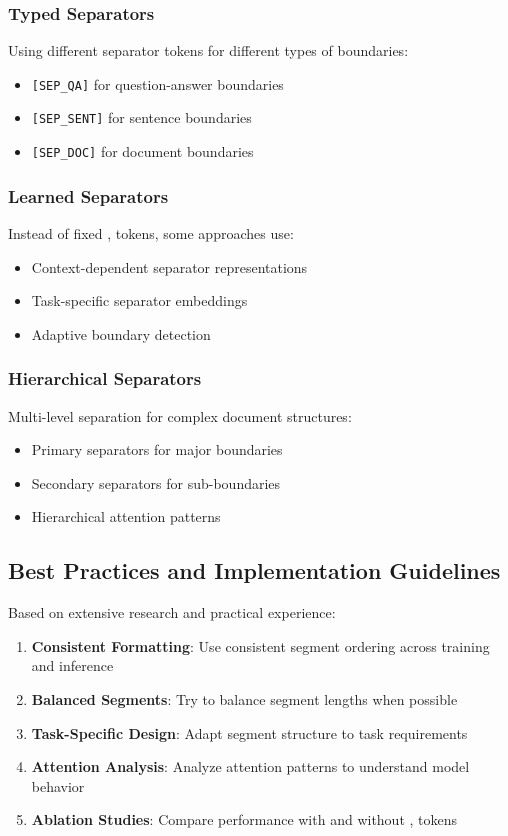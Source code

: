 \subsubsection{Typed Separators}
Using different separator tokens for different types of boundaries:
\begin{itemize}
\item \texttt{[SEP\_QA]} for question-answer boundaries
\item \texttt{[SEP\_SENT]} for sentence boundaries
\item \texttt{[SEP\_DOC]} for document boundaries
\end{itemize}

\subsubsection{Learned Separators}
Instead of fixed \sep{} tokens, some approaches use:
\begin{itemize}
\item Context-dependent separator representations
\item Task-specific separator embeddings
\item Adaptive boundary detection
\end{itemize}

\subsubsection{Hierarchical Separators}
Multi-level separation for complex document structures:
\begin{itemize}
\item Primary separators for major boundaries
\item Secondary separators for sub-boundaries
\item Hierarchical attention patterns
\end{itemize}

\subsection{Best Practices and Implementation Guidelines}

Based on extensive research and practical experience:

\begin{principle}
\begin{enumerate}
\item \textbf{Consistent Formatting}: Use consistent segment ordering across training and inference
\item \textbf{Balanced Segments}: Try to balance segment lengths when possible
\item \textbf{Task-Specific Design}: Adapt segment structure to task requirements
\item \textbf{Attention Analysis}: Analyze attention patterns to understand model behavior
\item \textbf{Ablation Studies}: Compare performance with and without \sep{} tokens
\end{enumerate}
\end{principle}

